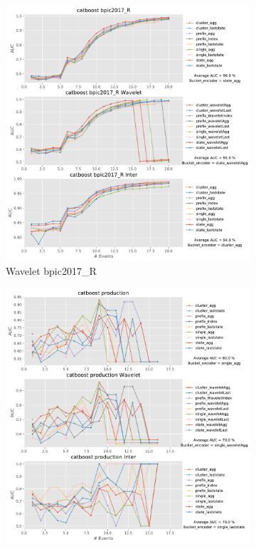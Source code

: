 \documentclass[twoside,11pt]{Latex/Classes/PhDthesisPSnPDF}
\begin{document}
\begin{figure}[!htbp] %
	
	\begin{subfigure}{0.48\textwidth}
		\includegraphics[width=\linewidth]{images/inter/catboost/bpic2017_R.pdf}
		\caption{Wavelet bpic2017\_R} \label{fig:b17ri}
	\end{subfigure}\hspace*{\fill}
	\begin{subfigure}{0.48\textwidth}
		\includegraphics[width=\linewidth]{images/inter/catboost/production.pdf}

\end{subfigure}
\end{figure}
\end{document}
